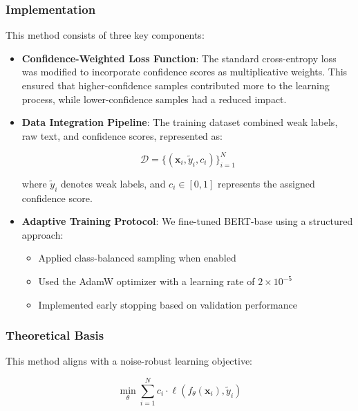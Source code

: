 \subsubsection{Implementation}  

This method consists of three key components:  

\begin{itemize}
    \item \textbf{Confidence-Weighted Loss Function}: The standard cross-entropy loss was modified to incorporate confidence scores as multiplicative weights. This ensured that higher-confidence samples contributed more to the learning process, while lower-confidence samples had a reduced impact.  

    \item \textbf{Data Integration Pipeline}: The training dataset combined weak labels, raw text, and confidence scores, represented as:  

    \begin{equation}
        \mathcal{D} = \{(\mathbf{x}_i, \tilde{y}_i, c_i)\}_{i=1}^N
    \end{equation}

    where $\tilde{y}_i$ denotes weak labels, and $c_i \in [0,1]$ represents the assigned confidence score.  

    \item \textbf{Adaptive Training Protocol}: We fine-tuned BERT-base using a structured approach:  
    \begin{itemize}
        \item Applied class-balanced sampling when enabled  
        \item Used the AdamW optimizer with a learning rate of $2\times10^{-5}$  
        \item Implemented early stopping based on validation performance  
    \end{itemize}
\end{itemize}  

\subsubsection{Theoretical Basis}  

This method aligns with a noise-robust learning objective:  

\begin{equation}
    \min_\theta \sum_{i=1}^N c_i \cdot \ell(f_\theta(\mathbf{x}_i), \tilde{y}_i)
\end{equation}

